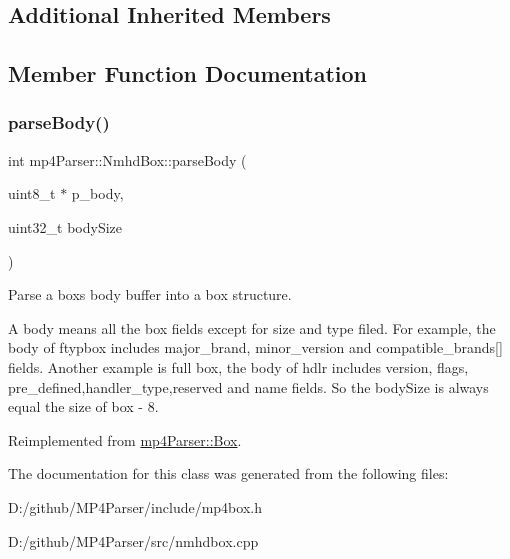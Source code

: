 \subsection*{Additional Inherited Members}


\subsection{Member Function Documentation}
\mbox{\label{classmp4_parser_1_1_nmhd_box_a958b5d3192ea2ac972c5f6f71c7cd6cc}} 
\subsubsection{\texorpdfstring{parseBody()}{parseBody()}}
{\footnotesize\ttfamily int mp4\+Parser\+::\+Nmhd\+Box\+::parse\+Body (\begin{DoxyParamCaption}\item[{uint8\+\_\+t $\ast$}]{p\+\_\+body,  }\item[{uint32\+\_\+t}]{body\+Size }\end{DoxyParamCaption})\hspace{0.3cm}{\ttfamily [virtual]}}



Parse a box\textquotesingle{}s body buffer into a box structure. 

A body means all the box fields except for size and type filed. For example, the body of ftypbox includes major\+\_\+brand, minor\+\_\+version and compatible\+\_\+brands\mbox{[}\mbox{]} fields. Another example is full box, the body of hdlr includes version, flags, pre\+\_\+defined,handler\+\_\+type,reserved and name fields. So the body\+Size is always equal the size of box -\/ 8. 

Reimplemented from \mbox{\hyperlink{classmp4_parser_1_1_box_a3dd0c084ac65bc77b69ac5ecaf796cb2}{mp4\+Parser\+::\+Box}}.



The documentation for this class was generated from the following files\+:\begin{DoxyCompactItemize}
\item 
D\+:/github/\+M\+P4\+Parser/include/mp4box.\+h\item 
D\+:/github/\+M\+P4\+Parser/src/nmhdbox.\+cpp\end{DoxyCompactItemize}
